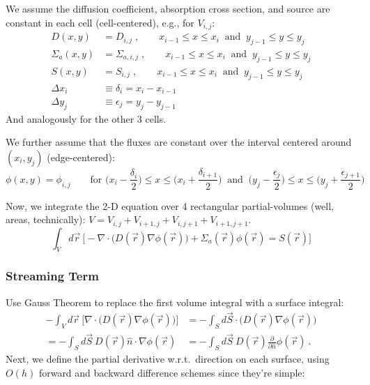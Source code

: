 \documentclass[12pt]{article}
\begin{document}
We assume the diffusion coefficient, absorption cross section, and source are constant in each cell (cell-centered), e.g., for $V_{i,j}$:
\begin{align}
D(x,y) &= D_{i,j}\;, \qquad x_{i-1} \leq x \leq x_i \:\text{ and }\: y_{j-1} \leq y \leq y_j \nonumber \\
%
\Sigma_a(x,y) &= \Sigma_{a,i,j}\;, \qquad x_{i-1} \leq x \leq x_i \:\text{ and }\: y_{j-1} \leq y \leq y_j \nonumber \\
%
S(x,y) &= S_{i,j}\;, \qquad x_{i-1} \leq x \leq x_i \:\text{ and }\: y_{j-1} \leq y \leq y_j \nonumber \\
%
\Delta x_i &\equiv \delta_i = x_{i} - x_{i-1} \nonumber \\
\Delta y_j &\equiv \epsilon_j = y_{j} - y_{j-1} \nonumber
\end{align}
And analogously for the other 3 cells.

We further assume that the fluxes are constant over the interval centered around $(x_i, y_j)$ (edge-centered):
%
\[\phi(x,y) = \phi_{i,j} \qquad \text{for } \bigl(x_i - \frac{\delta_i}{2}\bigr) \leq x \leq \bigl(x_i + \frac{\delta_{i+1}}{2}\bigr) \:\text{ and }\:\bigl(y_j - \frac{\epsilon_j}{2}\bigr) \leq x \leq \bigl(y_j + \frac{\epsilon_{j+1}}{2}\bigr) \]

Now, we integrate the 2-D equation over 4 rectangular partial-volumes (well, areas, technically): $V = V_{i,j} + V_{i+1,j} + V_{i,j+1} + V_{i+1,j+1}$.
%
\[\int_V d\vec{r}\:\bigl[-\nabla \cdot \bigl(D(\vec{r})\nabla \phi(\vec{r})\bigr) +\Sigma_a(\vec{r}) \phi(\vec{r}) = S(\vec{r}) \bigr]\]


\subsubsection*{Streaming Term}
Use Gauss Theorem to replace the first volume integral with a surface integral:
%
\begin{align}
-\int_V d\vec{r}\:\bigl[\nabla \cdot \bigl(D(\vec{r})\nabla \phi(\vec{r})\bigr)\bigr] &= -\int_S d\vec{S} \cdot\bigl(D(\vec{r})\nabla \phi(\vec{r})\bigr) \nonumber \\
%
= -\int_S d\vec{S}\: D(\vec{r})\hat{n} \cdot \nabla \phi(\vec{r}) &= -\int_S d\vec{S} \:D(\vec{r})\frac{\partial}{\partial \hat{n}}\phi(\vec{r})\:. \nonumber
\end{align}
%
Next, we define the partial derivative w.r.t.\ direction on each surface, using $O(h)$ forward and backward difference schemes since they're simple:
\end{document}
